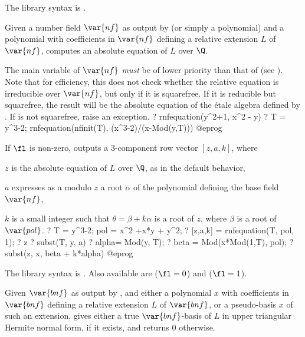 The library syntax is .

\label{se:rnfequation}
Given a number field
$\var{nf}$ as output by  (or simply a polynomial) and a
polynomial  with coefficients in $\var{nf}$ defining a relative
extension $L$ of $\var{nf}$, computes an absolute equation of $L$ over
$\Q$.

The main variable of $\var{nf}$ \emph{must} be of lower priority than that
of  (see ). Note that for efficiency, this does
not check whether the relative equation is irreducible over $\var{nf}$, but
only if it is squarefree. If it is reducible but squarefree, the result will
be the absolute equation of the \'etale algebra defined by . If
 is not squarefree, raise an  exception.
\bprog
? rnfequation(y^2+1, x^2 - y)
? T = y^3-2; rnfequation(nfinit(T), (x^3-2)/(x-Mod(y,T)))
@eprog

If $\fl$ is non-zero, outputs a 3-component row vector $[z,a,k]$, where

\item $z$ is the absolute equation of $L$ over $\Q$, as in the default
behavior,

\item $a$ expresses as a  modulo $z$ a root $\alpha$ of the
polynomial defining the base field $\var{nf}$,

\item $k$ is a small integer such that $\theta = \beta+k\alpha$
is a root of $z$, where $\beta$ is a root of $\var{pol}$.
\bprog
? T = y^3-2; pol = x^2 +x*y + y^2;
? [z,a,k] = rnfequation(T, pol, 1);
? z
? subst(T, y, a)
? alpha= Mod(y, T);
? beta = Mod(x*Mod(1,T), pol);
? subst(z, x, beta + k*alpha)
@eprog

The library syntax is .
Also available are
 ($\fl = 0$) and
 ($\fl = 1$).

\label{se:rnfhnfbasis}
Given $\var{bnf}$ as output by
, and either a polynomial $x$ with coefficients in $\var{bnf}$
defining a relative extension $L$ of $\var{bnf}$, or a pseudo-basis $x$ of
such an extension, gives either a true $\var{bnf}$-basis of $L$ in upper
triangular Hermite normal form, if it exists, and returns $0$ otherwise.

